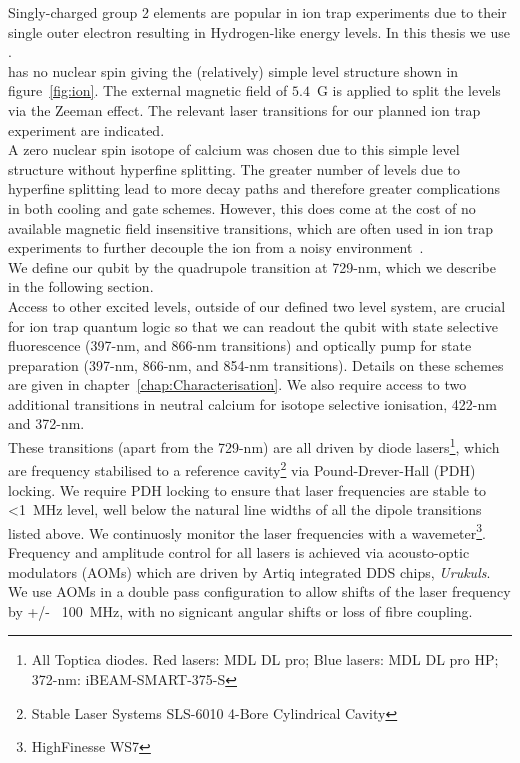     Singly-charged group 2 elements are popular in ion trap
    experiments due to their single outer electron resulting in Hydrogen-like
    energy levels. In this thesis we use \ca.\\
    \ca has
    no nuclear spin giving the
    (relatively) simple level structure shown in figure~\ref{fig:ion}. The external
    magnetic field of $5.4$~G is applied to split the levels via the Zeeman
    effect. The relevant laser transitions for our planned ion trap
    experiment are indicated.\\
    A zero nuclear spin isotope of calcium was chosen due to this simple level
    structure without hyperfine splitting. The greater number of levels due to
    hyperfine splitting lead to more decay paths and therefore greater
    complications in both cooling and gate schemes. However, this does come at
    the cost of no available magnetic field insensitive transitions, which are
    often used in ion trap experiments to further decouple the ion from a noisy
    environment~\cite{}. \\
    We define our qubit by the quadrupole transition at 729-nm, which we describe in the following section.\\
    Access to other excited levels, outside of our defined two level system, are crucial for ion trap quantum logic so that we can readout the qubit with state selective fluorescence (397-nm, and 866-nm transitions) and optically pump for state preparation (397-nm, 866-nm, and 854-nm transitions). Details on these schemes are given in chapter~\ref{chap:Characterisation}. We also require access to two additional transitions in neutral calcium for isotope selective ionisation, 422-nm and 372-nm.\\
    These transitions (apart from the 729-nm) are all driven by diode lasers\footnote{All Toptica diodes. Red lasers: MDL DL pro; Blue lasers: MDL DL pro HP; 372-nm: iBEAM-SMART-375-S}, which are frequency stabilised to a reference cavity\footnote{Stable Laser Systems SLS-6010 4-Bore Cylindrical Cavity} via Pound-Drever-Hall (PDH) locking. We require PDH locking to ensure that laser frequencies are stable to <1~MHz level, well below the natural line widths of all the dipole transitions listed above. We continuosly monitor the laser frequencies with a wavemeter\footnote{HighFinesse WS7}.\\
    Frequency and amplitude control for all lasers is achieved via acousto-optic modulators (AOMs) which are driven by Artiq integrated DDS chips, \emph{Urukuls}. We use AOMs in a double pass configuration to allow shifts of the laser frequency by +/- ~100~MHz, with no signicant angular shifts or loss of fibre coupling. 
    
